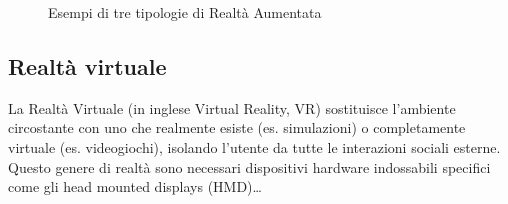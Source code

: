 \begin{figure}
    \centering
    \caption{Esempi di tre tipologie di Realtà Aumentata} 
    \label{fig:ARbased_type}
\end{figure}


%
\subsection{Realtà virtuale}
La Realtà Virtuale (in inglese Virtual Reality, VR) sostituisce l'ambiente circostante con uno che realmente esiste (es. simulazioni) o completamente virtuale (es. videogiochi), isolando l'utente da tutte le interazioni sociali esterne. Questo genere di realtà sono necessari dispositivi hardware indossabili specifici come gli head mounted displays (HMD)\dots

